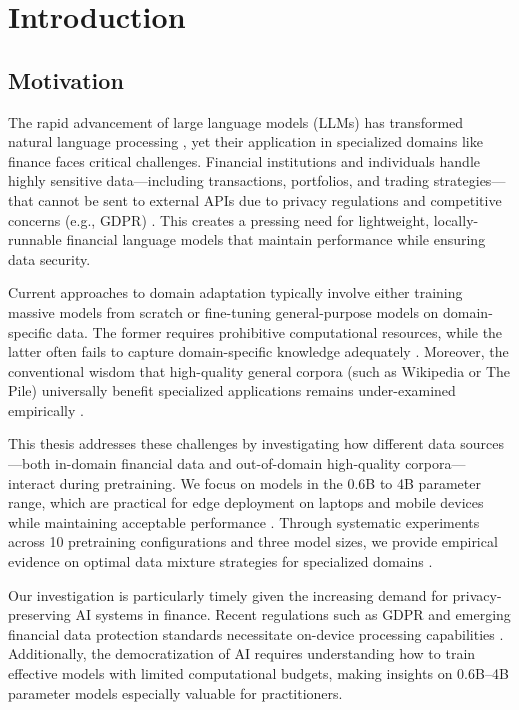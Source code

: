 \chapter{Introduction}

\section{Motivation}

The rapid advancement of large language models (LLMs) has transformed natural language processing \parencite{vaswani2017attention,radford2019language,brown2020language,touvron2023llama}, yet their application in specialized domains like finance faces critical challenges. Financial institutions and individuals handle highly sensitive data—including transactions, portfolios, and trading strategies—that cannot be sent to external APIs due to privacy regulations and competitive concerns (e.g., GDPR) \parencite{eu2016gdpr}. This creates a pressing need for lightweight, locally-runnable financial language models that maintain performance while ensuring data security.

Current approaches to domain adaptation typically involve either training massive models from scratch or fine-tuning general-purpose models on domain-specific data. The former requires prohibitive computational resources, while the latter often fails to capture domain-specific knowledge adequately \parencite{gururangan2020don}. Moreover, the conventional wisdom that high-quality general corpora (such as Wikipedia or The Pile) universally benefit specialized applications remains under-examined empirically \parencite{gao2020pile,raffel2020exploring,longpre2023pretrainer}.

This thesis addresses these challenges by investigating how different data sources—both in-domain financial data and out-of-domain high-quality corpora—interact during pretraining. We focus on models in the 0.6B to 4B parameter range, which are practical for edge deployment on laptops and mobile devices while maintaining acceptable performance \parencite{yang2024qwen2,xia2023sheared,team2024gemma,javaheripi2023phi}. Through systematic experiments across 10 pretraining configurations and three model sizes, we provide empirical evidence on optimal data mixture strategies for specialized domains \parencite{wu2023bloomberggpt}.

Our investigation is particularly timely given the increasing demand for privacy-preserving AI systems in finance. Recent regulations such as GDPR and emerging financial data protection standards necessitate on-device processing capabilities \parencite{eu2016gdpr}. Additionally, the democratization of AI requires understanding how to train effective models with limited computational budgets, making insights on 0.6B--4B parameter models especially valuable for practitioners.

